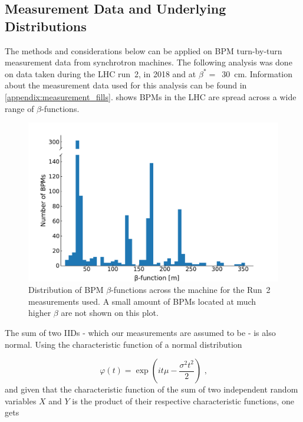 \subsection*{Measurement Data and Underlying Distributions}

The methods and considerations below can be applied on BPM turn-by-turn measurement data from synchrotron machines.
The following analysis was done on data taken during the LHC \Gls{run}~\num{2}, in \num{2018} and at \(\beta^{\ast} =\)~\qty{30}{\centi\meter}.
Information about the measurement data used for this analysis can be found in \cref{appendix:measurement_fills}.
 shows BPMs in the LHC are spread across a wide range of \(\beta\)-functions.

\begin{figure}[!htb]
    \centering
    \includegraphics*[width=\textwidth]{Figures/Other_Studies/bpms_betas_histogram.pdf}
    \caption{Distribution of BPM \(\beta\)-functions across the machine for the Run~\num{2} measurements used. A small amount of BPMs located at much higher \(\beta\) are not shown on this plot.}
    \label{figure:bpms_betas_histogram}
\end{figure}

The sum of two IIDs - which our measurements are assumed to be - is also normal.
Using the characteristic function of a normal distribution

\begin{equation}
    \varphi(t) = \exp \left( it \mu - \frac{\sigma^2 t^2}{2} \right) \text{ ,}
    \label{equations:normal_distribution_characteristic_function}
\end{equation}
and given that the characteristic function of the sum of two independent random variables \(X\) and \(Y\) is the product of their respective characteristic functions, one gets

